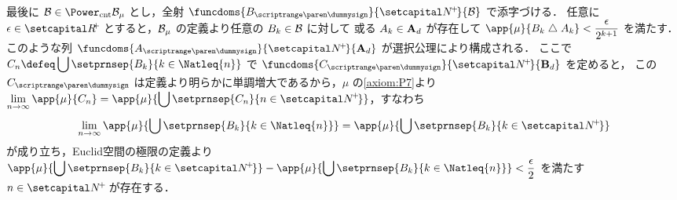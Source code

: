 \documentclass[a4paper,dvipdfmx,leqno]{jsarticle}
\begin{document}
{    \decosep
      最後に $\famB \in \Powercnt{\famB_{\mu}}$ とし，全射 $\funcdoms{B_{\dummysub}}{\setNpos}{\famB}$ で添字づける．
      任意に $\epsilon \in \setRpos$ とすると，$\mathcal{B}_{\mu}$ の定義より任意の $B_{k} \in \mathcal{B}$ に対して
      或る $A_{k} \in \mathbf{A}_{d}$ が存在して $\displaystyle \app{\mu}{B_{k} \symdiff A_{k}} < \frac{\epsilon}{2^{k + 1}}$ を満たす．
      このような列 $\funcdoms{A_{\dummysub}}{\setNpos}{\famAR{d}}$ が選択公理により構成される．
      ここで $\displaystyle C_{n} \defeq \bigcup \setprnsep{B_{k}}{k \in \Natleq{n}}$ で
      $\funcdoms{C_{\dummysub}}{\setNpos}{\famBorel{d}}$ を定めると，
      この $C_{\dummysub}$ は定義より明らかに単調増大であるから，$\mu$ の\eqref{axiom:P7}より
      $\displaystyle \lim_{n \to \infty} \app{\mu}{C_{n}} = \app{\mu}{\bigcup \setprnsep{C_{n}}{n \in \setNpos}}$，すなわち
      \begin{align*}
        \lim_{n \to \infty} \app{\mu}{\bigcup \setprnsep{B_{k}}{k \in \Natleq{n}}}
          = \app{\mu}{\bigcup \setprnsep{B_{k}}{k \in \setNpos}}
      \end{align*}
      が成り立ち，Euclid空間の極限の定義より
      $\displaystyle \app{\mu}{\bigcup \setprnsep{B_{k}}{k \in \setNpos}}
        - \app{\mu}{\bigcup \setprnsep{B_{k}}{k \in \Natleq{n}}} < \frac{\epsilon}{2}$
      を満たす $n \in \setNpos$ が存在する．
    }
\end{document}
